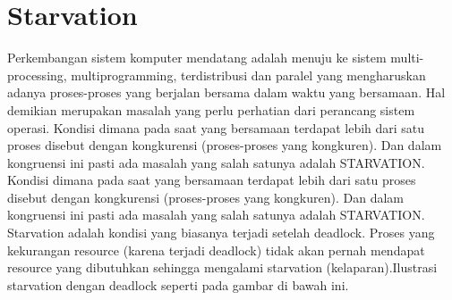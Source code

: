 \section{Starvation}
Perkembangan sistem komputer mendatang adalah menuju ke sistem multi-processing, multiprogramming, terdistribusi dan paralel yang mengharuskan adanya proses-proses yang berjalan bersama dalam waktu yang bersamaan. Hal demikian merupakan masalah yang perlu perhatian dari perancang sistem operasi. Kondisi dimana pada saat yang bersamaan terdapat lebih dari satu proses disebut dengan kongkurensi (proses-proses yang kongkuren). Dan dalam kongruensi ini pasti ada masalah yang salah satunya adalah STARVATION.
Kondisi dimana pada saat yang bersamaan terdapat lebih dari satu proses disebut dengan kongkurensi (proses-proses yang kongkuren). Dan dalam kongruensi ini pasti ada masalah yang salah satunya adalah STARVATION. Starvation adalah kondisi yang biasanya terjadi setelah deadlock. Proses yang kekurangan resource (karena terjadi deadlock) tidak akan pernah mendapat resource yang dibutuhkan sehingga mengalami starvation (kelaparan).Ilustrasi starvation dengan deadlock seperti pada gambar di bawah ini.

